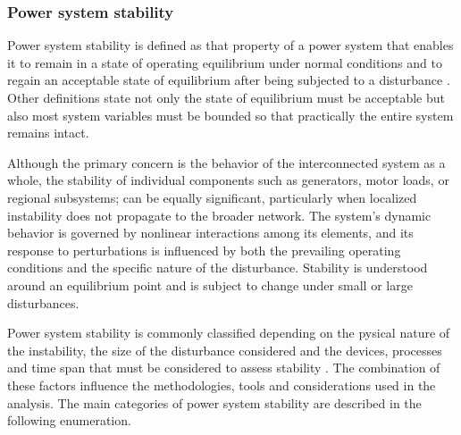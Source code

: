
\subsubsection{Power system stability}

Power system stability is defined as that property of a power system that enables it to 
remain in a state of operating equilibrium under normal conditions and to regain an acceptable 
state of equilibrium after being subjected to a disturbance \cite{StabilityAndControlKundur}. Other definitions
state not only the state of equilibrium must be acceptable but also most system variables must be 
bounded so that practically the entire system remains intact\cite{KundurDef}.


Although the primary concern is the behavior of the interconnected system as a whole, the stability of individual
components such as generators, motor loads, or regional subsystems; can be equally significant, particularly when 
localized instability does not propagate to the broader network. The system's dynamic behavior is governed by nonlinear 
interactions among its elements, and its response to perturbations is influenced by both the prevailing operating conditions
and the specific nature of the disturbance. Stability is understood around an equilibrium point and is subject to change
under small or large disturbances.

Power system stability is commonly classified depending on the pysical nature of the instability, the size of the disturbance 
considered and the devices, processes and time span that must be considered to assess stability \cite{KundurDef}.
The combination of these factors influence the methodologies, tools and considerations used in the analysis. The main categories of power system stability are 
described in the following enumeration.

